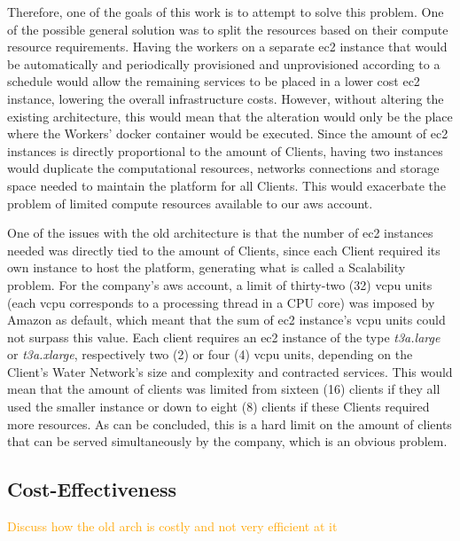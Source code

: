 Therefore, one of the goals of this work is to attempt to solve this problem. One of the possible general solution was to split the resources based on their compute resource requirements. Having the workers on a separate \gls{ec2} instance that would be automatically and periodically provisioned and unprovisioned according to a schedule would allow the remaining services to be placed in a lower cost \gls{ec2} instance, lowering the overall infrastructure costs. However, without altering the existing architecture, this would mean that the alteration would only be the place where the Workers' docker container would be executed. Since the amount of \gls{ec2} instances is directly proportional to the amount of Clients, having two instances would duplicate the computational resources, networks connections and storage space needed to maintain the platform for all Clients. This would exacerbate the problem of limited compute resources available to our \gls{aws} account.


One of the issues with the old architecture is that the number of \gls{ec2} instances needed was directly tied to the amount of Clients, since each Client required its own instance to host the platform, generating what is called a Scalability problem. For the company's \gls{aws} account, a limit of thirty-two (32) \gls{vcpu} units (each \gls{vcpu} corresponds to a processing thread in a CPU core) was imposed by Amazon as default, which meant that the sum of \gls{ec2} instance's \gls{vcpu} units could not surpass this value. Each client requires an \gls{ec2} instance of the type \textit{t3a.large} or \textit{t3a.xlarge}, respectively two (2) or four (4) \gls{vcpu} units, depending on the Client's Water Network's size and complexity and contracted services. This would mean that the amount of clients was limited from sixteen (16) clients if they all used the smaller instance or down to eight (8) clients if these Clients required more resources. As can be concluded, this is a hard limit on the amount of clients that can be served simultaneously by the company, which is an obvious problem.


\subsection{Cost-Effectiveness}\label{methodology:sss:cost-effectiveness}
\textcolor{orange}{ Discuss how the old arch is costly and not very efficient at it}

